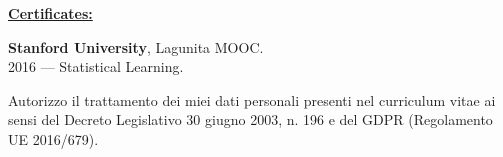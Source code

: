 \documentclass[a4paper,10pt,fullpage]{article}
\begin{document}
\begin{center}
\underline{\textbf{\large Certificates:}}
\end{center}	
\textbf{Stanford University}, Lagunita MOOC.\\
2016 --- Statistical Learning.


\vfill

\hline
\vspace{3pt}
\scriptsize Autorizzo il trattamento dei miei dati personali presenti nel curriculum vitae ai sensi del Decreto Legislativo 30 giugno 2003, n. 196 e del GDPR (Regolamento UE 2016/679).

\end{document}
